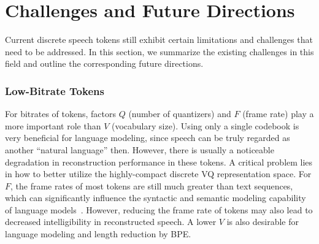 \vspace{-0.05in}
\section{Challenges and Future Directions}
\label{sec:challenge}

Current discrete speech tokens still exhibit certain limitations and challenges that need to be addressed.
In this section, we summarize the existing challenges in this field and outline the corresponding future directions.

\vspace{0.05in}
\subsubsection{Low-Bitrate Tokens}
For bitrates of tokens, factors $Q$ (number of quantizers) and $F$ (frame rate) play a more important role than $V$ (vocabulary size).
Using only a single codebook is very beneficial for language modeling, since speech can be truly regarded as another ``natural language'' then.
However, there is usually a noticeable degradation in reconstruction performance in these tokens.
A critical problem lies in how to better utilize the highly-compact discrete VQ representation space.
For $F$, the frame rates of most tokens are still much greater than text sequences, which can significantly influence the syntactic and semantic modeling capability of language models~\cite{wang2024whyspeech}.
However, reducing the frame rate of tokens may also lead to decreased intelligibility in reconstructed speech.
A lower $V$ is also desirable for language modeling and length reduction by BPE.

